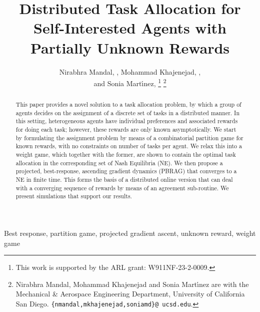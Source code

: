 \documentclass{IEEEtran}
\newcommand{\marginn}[1]{\marginpar{\color{blue}\tiny\ttfamily#1}}
\newcommand{\margin}[1]{\marginpar{\color{magenta}\tiny\ttfamily#1}}
\def \dynacr{PBRAG}
\begin{document}
\title{Distributed Task Allocation for Self-Interested Agents with Partially Unknown Rewards}
\author{Nirabhra Mandal, , \hspace{0.1ex} Mohammad Khajenejad, , \\ and Sonia Mart{\'\i}nez, 
\thanks{This work is supported by the ARL grant: W911NF-23-2-0009.}
\thanks{Nirabhra Mandal, Mohammad Khajenejad
and Sonia Mart{\'\i}nez are with the Mechanical \& Aerospace Engineering Department, University of California San Diego. \texttt{\{nmandal,mkhajenejad,soniamd\}@ ucsd.edu}.}}


\maketitle

\begin{abstract}
  This paper provides a novel solution to a task allocation problem,
  by which a group of agents decides on the assignment of a discrete
  set of tasks in a %
  distributed manner. In this setting, heterogeneous agents have
  individual preferences and associated rewards for doing each task;
  however, these rewards are only known asymptotically. We start by
  formulating the assignment problem by means of a combinatorial
  partition game for known rewards, with no constraints on number of
  tasks per agent. We relax this into a weight game, which together
  with the former, are shown to contain the optimal task allocation in
  the corresponding set of Nash Equilibria (NE). We then propose a
  projected, best-response, ascending gradient dynamics (\dynacr) that
  converges to a NE in finite time. This forms the basis of a
  distributed online version that can deal with a converging sequence
  of rewards by means of an agreement sub-routine. We present
  simulations that support our results.
\end{abstract}

\begin{IEEEkeywords}
Best response, partition game, projected gradient ascent, unknown reward, weight game
\end{IEEEkeywords}

\end{document}
